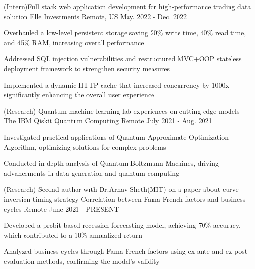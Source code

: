 \begin{cventries}
  \cventry
    {(Intern)Full stack web application development for high-performance trading data solution}
    {Elle Investments}
    {Remote, US}
    {May. 2022 - Dec. 2022}
    {
      \begin{cvitems}
          \item {Overhauled a low-level persistent storage saving 20\% write time, 40\% read time, and 45\% RAM, increasing overall performance}
          \item {Addressed SQL injection vulnerabilities and restructured MVC+OOP stateless deployment framework to strengthen security measures}
          \item {Implemented a dynamic HTTP cache that increased concurrency by 1000x, significantly enhancing the overall user experience}
      \end{cvitems}
    }

  \cventry
    {(Research) Quantum machine learning lab experiences on cutting edge models}
    {The IBM Qiskit Quantum Computing}
    {Remote}
    {July 2021 - Aug. 2021}
    {
      \begin{cvitems}
        \item {Investigated practical applications of Quantum Approximate Optimization Algorithm, optimizing solutions for complex problems}
        \item {Conducted in-depth analysis of Quantum Boltzmann Machines, driving advancements in data generation and quantum computing}
      \end{cvitems}
    }

  \cventry
    {(Research) Second-author with Dr.Arnav Sheth(MIT) on a paper about curve inversion timing strategy}
    {Correlation between Fama-French factors and business cycles}
    {Remote}
    {June 2021 - PRESENT}
    {
      \begin{cvitems}
        \item {Developed a probit-based recession forecasting model, achieving 70\% accuracy, which contributed to a 10\% annualized return}
        \item {Analyzed business cycles through Fama-French factors using ex-ante and ex-post evaluation methods, confirming the model's validity}
      \end{cvitems}
    }


\end{cventries}
